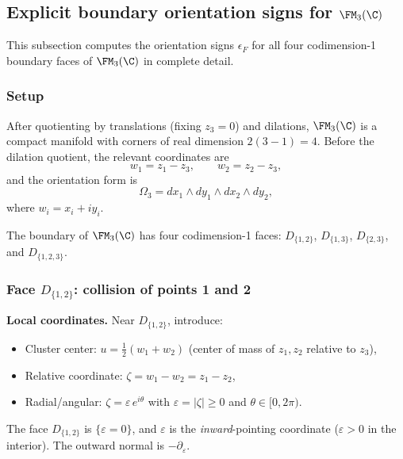 \subsection{\texorpdfstring{Explicit boundary orientation signs for $\FM_3(\C)$}{Explicit boundary orientation signs for FM 3(C)}}
\label{subsec:FM3-orientations}

This subsection computes the orientation signs $\epsilon_F$ for all four codimension-1 boundary faces of $\FM_3(\C)$ in complete detail.

\subsubsection{Setup}

After quotienting by translations (fixing $z_3 = 0$) and dilations, $\FM_3(\C)$ is a compact manifold with corners of real dimension $2(3-1) = 4$. Before the dilation quotient, the relevant coordinates are
\[
w_1 = z_1 - z_3,\qquad w_2 = z_2 - z_3,
\]
and the orientation form is
\begin{equation}
\label{eq:Omega3}
\Omega_3 = dx_1\wedge dy_1 \wedge dx_2 \wedge dy_2,
\end{equation}
where $w_i = x_i + iy_i$.

The boundary of $\FM_3(\C)$ has four codimension-1 faces: $D_{\{1,2\}}$, $D_{\{1,3\}}$, $D_{\{2,3\}}$, and $D_{\{1,2,3\}}$.

\subsubsection{\texorpdfstring{Face $D_{\{1,2\}}$: collision of points 1 and 2}{Face D12: collision of points 1 and 2}}

\textbf{Local coordinates.} Near $D_{\{1,2\}}$, introduce:
\begin{itemize}
\item Cluster center: $u = \frac{1}{2}(w_1 + w_2)$ (center of mass of $z_1, z_2$ relative to $z_3$),
\item Relative coordinate: $\zeta = w_1 - w_2 = z_1 - z_2$,
\item Radial/angular: $\zeta = \varepsilon\, e^{i\theta}$ with $\varepsilon = |\zeta| \ge 0$ and $\theta \in [0,2\pi)$.
\end{itemize}
The face $D_{\{1,2\}}$ is $\{\varepsilon = 0\}$, and $\varepsilon$ is the \emph{inward}-pointing coordinate ($\varepsilon > 0$ in the interior). The outward normal is $-\partial_\varepsilon$.

